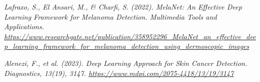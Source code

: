 \documentclass[a4paper,12pt]{report}
\begin{document}
\begin{spacing}{1.5}
\begin{thebibliography}{99}
 \emph{Lafraxo, S., El Ansari, M., \& Charfi, S. (2022). MelaNet: An Effective Deep Learning Framework for Melanoma Detection. Multimedia Tools and Applications. \url{https://www.researchgate.net/publication/358952296_MelaNet_an_effective_deep_learning_framework_for_melanoma_detection_using_dermoscopic_images}}

 \emph{Alenezi, F., et al. (2023). Deep Learning Approach for Skin Cancer Detection. Diagnostics, 13(19), 3147. \url{https://www.mdpi.com/2075-4418/13/19/3147}}








\end{thebibliography}

\end{spacing}
\end{document}
